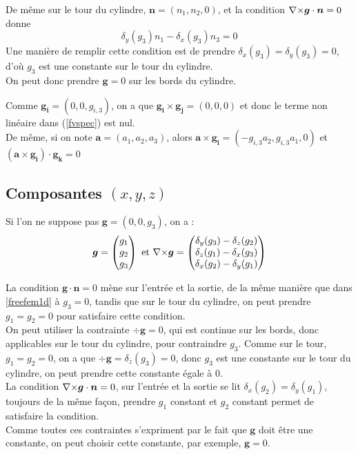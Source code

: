 De même sur le tour du cylindre, $\bm{n}=(n_1,n_2,0)$, et la condition ${\nabla\times}\bm{g}\cdot\bm{n}=0$ donne \[\delta_y(g_3)n_1-\delta_x(g_3)n_3=0\]
Une manière de remplir cette condition est de prendre $\delta_x(g_3)=\delta_y(g_3)=0$, d'où $g_3$ est une constante sur le tour du cylindre.\\
On peut donc prendre $\bm{g}=0$ sur les bords du cylindre.

Comme $\bm{g_i}=(0,0,g_{i,3})$, on a que $\bm{g_i}\times\bm{g_j}=(0,0,0)$ et donc le terme non linéaire dans (\ref{fvspec}) est nul.\\
De même, si on note $\bm{a}=(a_1,a_2,a_3)$, alors $\bm{a}\times\bm{g_i}=(-g_{i,3}a_2, g_{i,3}a_1, 0)$ et $(\bm{a}\times\bm{g_i})\cdot\bm{g_k}=0$

\subsection{Composantes $(x,y,z)$}
Si l'on ne suppose pas $\bm{g}=(0,0,g_3)$, on a : 
\[
\bm{g}=
\begin{pmatrix}
g_1\\
g_2\\
g_3
\end{pmatrix}
\text{ et }
{\nabla\times}\bm{g}=
\begin{pmatrix}
\delta_y(g_3)-\delta_z(g_2)\\
\delta_z(g_1)-\delta_x(g_3)\\
\delta_x(g_2)-\delta_y(g_1)
\end{pmatrix}
\]

La condition $\bm{g}\cdot\bm{n}=0$ mène sur l'entrée et la sortie, de la même manière que dans \ref{freefem1d} à $g_3=0$, tandis que sur le tour du cylindre, on peut prendre $g_1=g_2=0$ pour satisfaire cette condition.\\

On peut utiliser la contrainte $\div\bm{g}=0$, qui est continue sur les bords, donc applicables sur le tour du cylindre, pour contraindre $g_3$. Comme sur le tour, $g_1=g_2=0$, on a que $\div\bm{g}=\delta_z(g_3)=0$, donc $g_3$ est une constante sur le tour du cylindre, on peut prendre cette constante égale à 0.\\

La condition ${\nabla\times}\bm{g}\cdot\bm{n}=0$, sur l'entrée et la sortie se lit $\delta_x(g_2)=\delta_y(g_1)$, toujours de la même façon, prendre $g_1$ constant et $g_2$ constant permet de satisfaire la condition.\\

Comme toutes ces contraintes s'expriment par le fait que $\bm{g}$ doit être une constante, on peut choisir cette constante, par exemple, $\bm{g}=0$.

